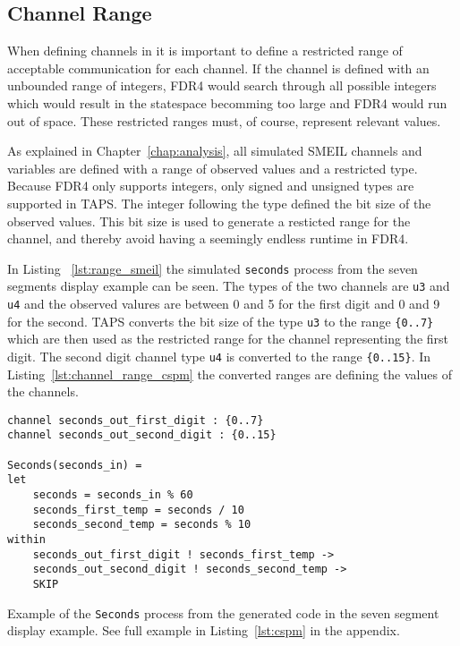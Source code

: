 \subsection{\cspm{} Channel Range}
When defining channels in \cspm{} it is important to define a restricted range of acceptable communication for each channel. If the channel is defined with an unbounded range of integers, FDR4 would search through all possible integers which would result in the statespace becomming too large and FDR4 would run out of space. These restricted ranges must, of course, represent relevant values.

As explained in Chapter~\ref{chap:analysis}, all simulated SMEIL channels and variables are defined with a range of observed values and a restricted type.
Because FDR4 only supports integers, only signed and unsigned types are supported in TAPS. The integer following the type defined the bit size of the observed values. This bit size is used to generate a resticted range for the \cspm{} channel, and thereby avoid having a seemingly endless runtime in FDR4.

In Listing ~\ref{lst:range_smeil} the simulated \texttt{seconds} process from the seven segments display example can be seen. The types of the two channels are \texttt{u3} and \texttt{u4} and the observed valures are between 0 and 5 for the first digit and 0 and 9 for the second. TAPS converts the bit size of the type \texttt{u3} to the range \texttt{\{0..7\}} which are then used as the restricted range for the \cspm{} channel representing the first digit. The second digit channel type \texttt{u4} is converted to the range \texttt{\{0..15\}}.  In Listing~\ref{lst:channel_range_cspm} the converted ranges are defining the values of the \cspm{} channels.

\begin{listing}
\begin{verbatim}
channel seconds_out_first_digit : {0..7}
channel seconds_out_second_digit : {0..15}

Seconds(seconds_in) =
let
    seconds = seconds_in % 60
    seconds_first_temp = seconds / 10
    seconds_second_temp = seconds % 10
within
    seconds_out_first_digit ! seconds_first_temp ->
    seconds_out_second_digit ! seconds_second_temp ->
    SKIP
\end{verbatim}
\caption{Example of the \texttt{Seconds} process from the generated \cspm{} code in the seven segment display example. See full example in Listing~\ref{lst:cspm} in the appendix.}
\label{lst:channel_range_cspm}
\end{listing}

